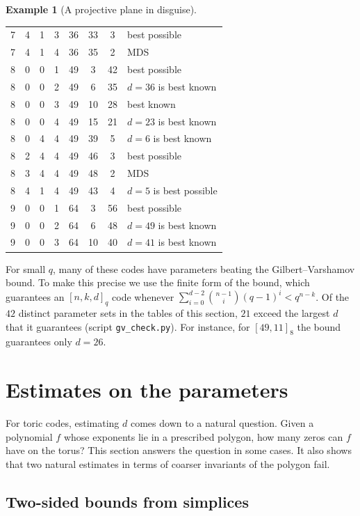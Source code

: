 \documentclass[12pt,letterpaper]{article}
\numberwithin{equation}{section}
\theoremstyle{definition}
\newtheorem{example}[theorem]{Example}
\theoremstyle{remark}
\begin{document}
\begin{example}[A projective plane in disguise]
\begin{center}
\begin{tabular}{@{}cccccccl@{}}
7 & 4 & 1 & 3 & 36 & 33 & 3 & best possible\\
7 & 4 & 1 & 4 & 36 & 35 & 2 & MDS\\
8 & 0 & 0 & 1 & 49 & 3 & 42 & best possible\\
8 & 0 & 0 & 2 & 49 & 6 & 35 & $d=36$ is best known\\
8 & 0 & 0 & 3 & 49 & 10 & 28 & best known\\
8 & 0 & 0 & 4 & 49 & 15 & 21 & $d=23$ is best known\\
8 & 0 & 4 & 4 & 49 & 39 & 5 & $d=6$ is best known\\
8 & 2 & 4 & 4 & 49 & 46 & 3 & best possible\\
8 & 3 & 4 & 4 & 49 & 48 & 2 & MDS\\
8 & 4 & 1 & 4 & 49 & 43 & 4 & $d=5$ is best possible\\
9 & 0 & 0 & 1 & 64 & 3 & 56 & best possible\\
9 & 0 & 0 & 2 & 64 & 6 & 48 & $d=49$ is best known\\
9 & 0 & 0 & 3 & 64 & 10 & 40 & $d=41$ is best known\\
\bottomrule
\end{tabular}
\end{center}
\end{example}

For small $q$, many of these codes have parameters beating the
Gilbert--Varshamov bound. To make this precise we use the finite form of the
bound, which guarantees an $[n,k,d]_q$ code whenever
$\sum_{i=0}^{d-2}\binom{n-1}{i}(q-1)^i<q^{n-k}$. Of the $42$ distinct parameter
sets in the tables of this section, $21$ exceed the largest $d$ that it
guarantees (script \texttt{gv\_check.py}). For instance, for $[49,11]_8$ the
bound guarantees only $d=26$.

\section{Estimates on the parameters}\label{sec:estimate}

For toric codes, estimating $d$ comes down to a natural question. Given a
polynomial $f$ whose exponents lie in a prescribed polygon, how many zeros can
$f$ have on the torus? This section answers the question in some cases. It
also shows that two natural estimates in terms of coarser invariants of the
polygon fail.

\subsection{Two-sided bounds from simplices}
\end{document}
